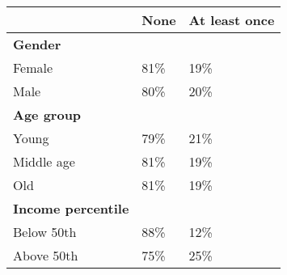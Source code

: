 \begin{center}
\footnotesize
{}
\begin{tabularx} {7.5cm} {@{} l Y Y @{}}
\toprule
 & \textbf{None} & \textbf{At least once} \\

\midrule 

\textbf{Gender} \\
Female & 81\% & 19\% \\
Male & 80\% & 20\% \\
\midrule 

\textbf{Age group} \\
Young & 79\% & 21\% \\
Middle age & 81\% & 19\% \\
Old & 81\% & 19\% \\
\midrule 

\textbf{Income percentile} \\
Below 50th & 88\% & 12\% \\
Above 50th & 75\% & 25\% \\
\bottomrule
\end{tabularx}
\normalsize
\end{center}
